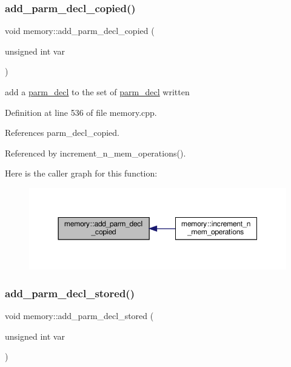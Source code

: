 \subsubsection{\texorpdfstring{add\+\_\+parm\+\_\+decl\+\_\+copied()}{add\_parm\_decl\_copied()}}
{\footnotesize\ttfamily void memory\+::add\+\_\+parm\+\_\+decl\+\_\+copied (\begin{DoxyParamCaption}\item[{unsigned int}]{var }\end{DoxyParamCaption})}



add a \hyperlink{structparm__decl}{parm\+\_\+decl} to the set of \hyperlink{structparm__decl}{parm\+\_\+decl} written 



Definition at line 536 of file memory.\+cpp.



References parm\+\_\+decl\+\_\+copied.



Referenced by increment\+\_\+n\+\_\+mem\+\_\+operations().

Here is the caller graph for this function\+:
\nopagebreak
\begin{figure}[H]
\begin{center}
\leavevmode
\includegraphics[width=350pt]{d8/d99/classmemory_aa397acb159d30fa221af9cd66c442d7f_icgraph}
\end{center}
\end{figure}
\mbox{\label{classmemory_a480a93ec1ca630ee87d15b1ad127f3f2}} 
\subsubsection{\texorpdfstring{add\+\_\+parm\+\_\+decl\+\_\+stored()}{add\_parm\_decl\_stored()}}
{\footnotesize\ttfamily void memory\+::add\+\_\+parm\+\_\+decl\+\_\+stored (\begin{DoxyParamCaption}\item[{unsigned int}]{var }\end{DoxyParamCaption})}



